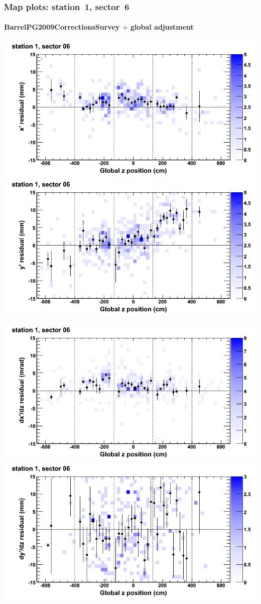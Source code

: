 \documentclass[compress]{beamer}
\begin{document}
\begin{frame}
\frametitle{Map plots: station~1, sector~6}
\framesubtitle{BarrelPG2009CorrectionsSurvey $+$ global adjustment}
\includegraphics[width=0.5\linewidth]{mapplots_re01/DTvsz_st1sec06_x.png}
\includegraphics[width=0.5\linewidth]{mapplots_re01/DTvsz_st1sec06_y.png}

\includegraphics[width=0.5\linewidth]{mapplots_re01/DTvsz_st1sec06_dxdz.png}
\includegraphics[width=0.5\linewidth]{mapplots_re01/DTvsz_st1sec06_dydz.png}
\end{frame}
\end{document}
